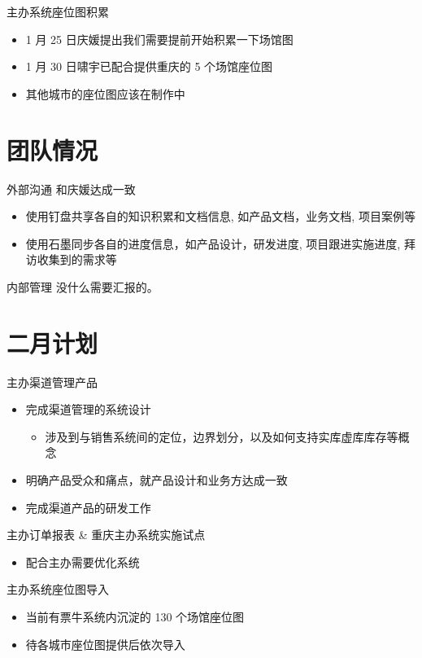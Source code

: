 \documentclass[presentation, bigger]{beamer}
\begin{document}
\begin{frame}[label={sec:orgcd6792f}]{主办系统座位图积累}
\begin{itemize}
\item 1 月 25 日庆媛提出我们需要提前开始积累一下场馆图
\item 1 月 30 日啸宇已配合提供重庆的 5 个场馆座位图
\item 其他城市的座位图应该在制作中
\end{itemize}
\end{frame}

\section{团队情况}
\label{sec:org0e0405a}
\begin{frame}[label={sec:orgb7296f7}]{外部沟通}
和庆媛达成一致
\begin{itemize}
\item 使用钉盘共享各自的知识积累和文档信息, 如产品文档，业务文档, 项目案例等
\item 使用石墨同步各自的进度信息，如产品设计，研发进度, 项目跟进实施进度, 拜访收集到的需求等
\end{itemize}
\end{frame}

\begin{frame}[label={sec:org8146c7f}]{内部管理}
没什么需要汇报的。
\end{frame}

\section{二月计划}
\label{sec:orgf3eaf4f}

\begin{frame}[label={sec:org8301f83}]{主办渠道管理产品}
\begin{itemize}
\item 完成渠道管理的系统设计
\begin{itemize}
\item 涉及到与销售系统间的定位，边界划分，以及如何支持实库虚库库存等概念
\end{itemize}
\item 明确产品受众和痛点，就产品设计和业务方达成一致
\item 完成渠道产品的研发工作
\end{itemize}
\end{frame}

\begin{frame}[label={sec:org71bdcbe}]{主办订单报表 \& 重庆主办系统实施试点}
\begin{itemize}
\item 配合主办需要优化系统
\end{itemize}
\end{frame}

\begin{frame}[label={sec:org05355ff}]{主办系统座位图导入}
\begin{itemize}
\item 当前有票牛系统内沉淀的 130 个场馆座位图
\item 待各城市座位图提供后依次导入
\end{itemize}
\end{frame}
\end{document}
